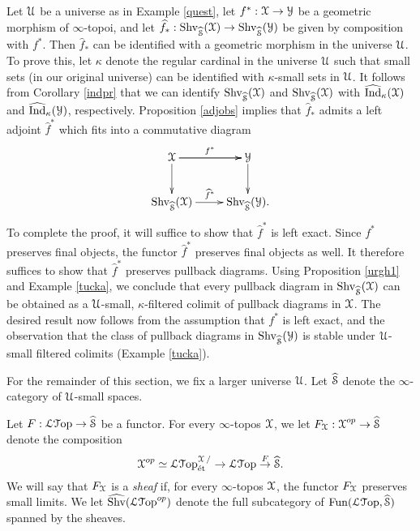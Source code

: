 \begin{remark}\label{postquest}
Let $\operatorname{\mathcal{U}}$ be a universe as in Example \ref{quest}, let $f^{\ast}: \operatorname{\mathcal{X}} \rightarrow \operatorname{\mathcal{Y}}$ be a geometric morphism of $\infty$-topoi, and let
$\widehat{f}_{\ast}: \operatorname{Shv}_{ \widehat{\operatorname{\mathcal{S}}}}(\operatorname{\mathcal{X}}) \rightarrow \operatorname{Shv}_{ \widehat{\operatorname{\mathcal{S}}}}(\operatorname{\mathcal{Y}})$ be
given by composition with $f^{\ast}$. Then $\widehat{f}_{\ast}$ can be identified with a geometric morphism in the universe $\operatorname{\mathcal{U}}$. To prove this, let $\kappa$ denote the regular cardinal
in the universe $\operatorname{\mathcal{U}}$ such that small sets (in our original universe) can be identified with
$\kappa$-small sets in $\operatorname{\mathcal{U}}$. It follows from Corollary \ref{indpr} that we can identify
$\operatorname{Shv}_{\widehat{\operatorname{\mathcal{S}}}}(\operatorname{\mathcal{X}})$ and $\operatorname{Shv}_{\widehat{\operatorname{\mathcal{S}}}}(\operatorname{\mathcal{X}})$ with
$\widehat{\operatorname{Ind}}_{\kappa}(\operatorname{\mathcal{X}})$ and $\widehat{\operatorname{Ind}}_{\kappa}(\operatorname{\mathcal{Y}})$, respectively.
Proposition \ref{adjobs} implies that $\widehat{f}_{\ast}$ admits a left adjoint
$\widehat{f}^{\ast}$ which fits into a commutative diagram
$$ \xymatrix{ \calX \ar[r]^{f^{\ast}} \ar[r] \ar[d] & \calY \ar[d] \\
\Shv_{\widehat{\SSet}}(\calX) \ar[r]^{ \widehat{f}^{\ast} } & \Shv_{ \widehat{\SSet}}(\calY). }$$
To complete the proof, it will suffice to show that $\widehat{f}^{\ast}$ is left exact.
Since $f^{\ast}$ preserves final objects, the functor $\widehat{f}^{\ast}$ preserves final objects as well.
It therefore suffices to show that $\widehat{f}^{\ast}$ preserves pullback diagrams. Using Proposition \ref{urgh1} and Example \ref{tucka}, we conclude that every pullback diagram
in $\operatorname{Shv}_{ \widehat{\operatorname{\mathcal{S}}}}(\operatorname{\mathcal{X}})$ can be obtained as a $\operatorname{\mathcal{U}}$-small, $\kappa$-filtered colimit of pullback diagrams in $\operatorname{\mathcal{X}}$. The desired result now follows from the assumption that $f^{\ast}$ is left exact, and the observation that the class of pullback diagrams in $\operatorname{Shv}_{ \widehat{\operatorname{\mathcal{S}}}}(\operatorname{\mathcal{Y}})$ is stable under $\operatorname{\mathcal{U}}$-small filtered colimits (Example \ref{tucka}).
\end{remark}

For the remainder of this section, we fix a larger universe $\operatorname{\mathcal{U}}$. Let
$\widehat{\operatorname{\mathcal{S}}}$ denote the $\infty$-category of $\operatorname{\mathcal{U}}$-small spaces.

\begin{notation}
Let $F: \operatorname{\mathcal{L}{\mathcal T}op} \rightarrow \widehat{\operatorname{\mathcal{S}}}$ be a functor. For every $\infty$-topos
$\operatorname{\mathcal{X}}$, we let $F_{\operatorname{\mathcal{X}}}: \operatorname{\mathcal{X}}^{op} \rightarrow \widehat{\operatorname{\mathcal{S}}}$ denote the composition
$$ \operatorname{\mathcal{X}}^{op} \simeq \operatorname{\mathcal{L}{\mathcal T}op}_{\text{\'{e}t}}^{\operatorname{\mathcal{X}}/} \rightarrow \operatorname{\mathcal{L}{\mathcal T}op} \stackrel{F}{\rightarrow} \widehat{\operatorname{\mathcal{S}}}.$$
We will say that $F_{\operatorname{\mathcal{X}}}$ is a {\it sheaf} if, for every $\infty$-topos $\operatorname{\mathcal{X}}$, the functor
$F_{\operatorname{\mathcal{X}}}$ preserves small limits. We let $\widehat{\operatorname{Shv}}( \operatorname{\mathcal{L}{\mathcal T}op}^{op} )$ denote the full subcategory of $\operatorname{Fun}( \operatorname{\mathcal{L}{\mathcal T}op}, \widehat{\operatorname{\mathcal{S}}} )$ spanned by the sheaves.
\end{notation}

